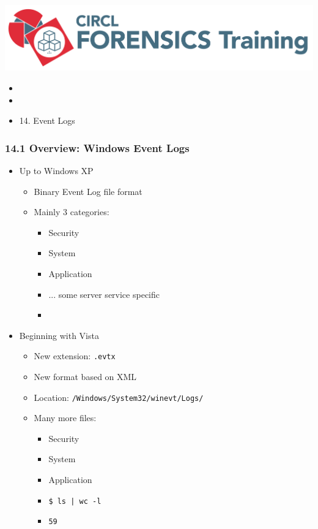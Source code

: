 

\begin{frame}
    \includegraphics[scale=.3]{images/logo-circl-Forensics.png}
    \begin{itemize}
        \item[]
        \item[]
        \item[] 14. Event Logs
    \end{itemize}
\end{frame}


\begin{frame}[fragile]
  \frametitle{14.1 Overview: Windows Event Logs}
    \begin{itemize}
        \item Up to Windows XP
            \begin{itemize}
                \item Binary Event Log file format
                \item Mainly 3 categories:
                \begin{itemize}
			\item[] Security
			\item[] System
			\item[] Application
			\item[] ... some server service specific
			\item[]
                \end{itemize}
            \end{itemize}
        \item Beginning with Vista
            \begin{itemize}
		\item New extension: \texttt{.evtx}
                \item New format based on XML
		\item Location: \texttt{/Windows/System32/winevt/Logs/}
                \item Many more files:
                \begin{itemize}
			\item[] Security
			\item[] System
			\item[] Application
			\item[] \texttt{\$ ls | wc -l}
			\item[] \texttt{59}
                \end{itemize}
            \end{itemize}
    \end{itemize}
\end{frame}


